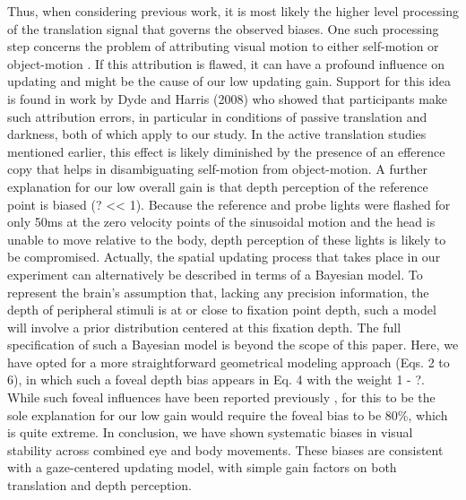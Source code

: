 Thus, when considering previous work, it is most likely the higher level processing of the translation signal that governs the observed biases. One such processing step concerns the problem of attributing visual motion to either self-motion or object-motion \cite{vonhelmholtz1867}. If this attribution is flawed, it can have a profound influence on updating and might be the cause of our low updating gain. Support for this idea is found in work by Dyde and Harris (2008) who showed that participants make such attribution errors, in particular in conditions of passive translation and darkness, both of which apply to our study. In the active translation studies mentioned earlier, this effect is likely diminished by the presence of an efference copy that helps in disambiguating self-motion from object-motion.
A further explanation for our low overall gain is that depth perception of the reference point is biased (? << 1). Because the reference and probe lights were flashed for only 50ms at the zero velocity points of the sinusoidal motion and the head is unable to move relative to the body, depth perception of these lights is likely to be compromised. Actually, the spatial updating process that takes place in our experiment can alternatively be described in terms of a Bayesian model. To represent the brain's assumption that, lacking any precision information, the depth of peripheral stimuli is at or close to fixation point depth, such a model will involve a prior distribution centered at this fixation depth. The full specification of such a Bayesian model is beyond the scope of this paper. Here, we have opted for a more straightforward geometrical modeling approach (Eqs. 2 to 6), in which such a foveal depth bias appears in Eq. 4 with the weight 1 - ?. While such foveal influences have been reported previously \cite{brenner2008, mateeff1983}, for this to be the sole explanation for our low gain would require the foveal bias to be 80\%, which is quite extreme.
In conclusion, we have shown systematic biases in visual stability across combined eye and body movements. These biases are consistent with a gaze-centered updating model, with simple gain factors on both translation and depth perception.  

